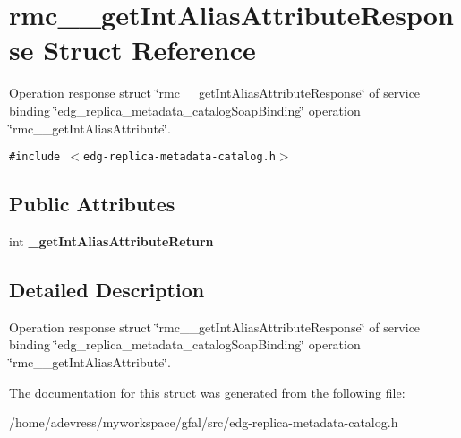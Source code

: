 \section{rmc\_\-\_\-get\-Int\-Alias\-Attribute\-Response Struct Reference}
\label{structrmc____getIntAliasAttributeResponse}
Operation response struct \char`\"{}rmc\_\-\_\-get\-Int\-Alias\-Attribute\-Response\char`\"{} of service binding \char`\"{}edg\_\-replica\_\-metadata\_\-catalog\-Soap\-Binding\char`\"{} operation \char`\"{}rmc\_\-\_\-get\-Int\-Alias\-Attribute\char`\"{}.  


{\tt \#include $<$edg-replica-metadata-catalog.h$>$}

\subsection*{Public Attributes}
\begin{CompactItemize}
\item 
int \textbf{\_\-get\-Int\-Alias\-Attribute\-Return}\label{structrmc____getIntAliasAttributeResponse_41f2e450bfd7ae979543f48032db37f9}

\end{CompactItemize}


\subsection{Detailed Description}
Operation response struct \char`\"{}rmc\_\-\_\-get\-Int\-Alias\-Attribute\-Response\char`\"{} of service binding \char`\"{}edg\_\-replica\_\-metadata\_\-catalog\-Soap\-Binding\char`\"{} operation \char`\"{}rmc\_\-\_\-get\-Int\-Alias\-Attribute\char`\"{}. 



The documentation for this struct was generated from the following file:\begin{CompactItemize}
\item 
/home/adevress/myworkspace/gfal/src/edg-replica-metadata-catalog.h\end{CompactItemize}
